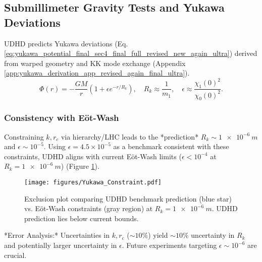 \documentclass[12pt, a4paper]{article} %
\begin{document}
\subsection{Submillimeter Gravity Tests and Yukawa Deviations}
UDHD predicts Yukawa deviations (Eq. \ref{eq:yukawa_potential_final_sec4_final_full_revised_new_again_ultra}) derived from warped geometry and KK mode exchange (Appendix \ref{app:yukawa_derivation_app_revised_again_final_ultra}).
\begin{equation}
\Phi(r) = -\frac{GM}{r} \left(1 + \epsilon e^{-r/R_k}\right), \quad R_k \approx \frac{1}{m_1}, \quad \epsilon \approx \frac{\chi_1(0)^2}{\chi_0(0)^2}.
\label{eq:yukawa_potential_final_sec4_final_full_revised_new_again_ultra}
\end{equation}
\subsubsection*{Consistency with Eöt-Wash}
Constraining \(k, r_c\) via hierarchy/LHC leads to the *prediction* \(R_k \sim \SI{1e-6}{m}\) and \(\epsilon \sim 10^{-5}\). Using \( \epsilon = 4.5 \times 10^{-5} \) as a benchmark consistent with these constraints, UDHD aligns with current Eöt-Wash limits (\( \epsilon < 10^{-4} \) at \( R_k = \SI{1e-6}{m} \)) \cite{Wagner2012Torsion} (Figure \ref{fig:eotwash_final_sec4_final_full_revised_new_again_ultra}).
\begin{figure}[h!]
    \centering
    \texttt{[image: figures/Yukawa\_Constraint.pdf]} %
    \caption{Exclusion plot comparing UDHD benchmark prediction (blue star) vs. Eöt-Wash constraints (gray region) at \(R_k = \SI{1e-6}{m}\). UDHD prediction lies below current bounds.}
    \label{fig:eotwash_final_sec4_final_full_revised_new_again_ultra}
\end{figure}
*Error Analysis:* Uncertainties in \(k, r_c\) (\(\sim 10\%\)) yield \( \sim 10\% \) uncertainty in \(R_k\) and potentially larger uncertainty in \(\epsilon\). Future experiments targeting \( \epsilon \sim 10^{-6} \) are crucial.
\end{document}
